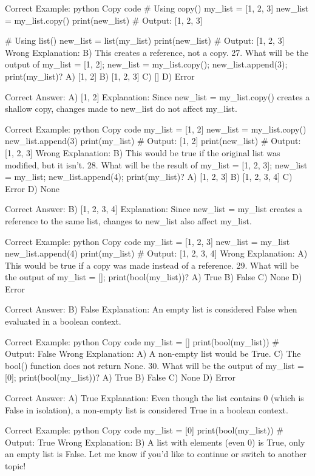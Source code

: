 Correct Example:
python
Copy code
# Using copy()
my_list = [1, 2, 3]
new_list = my_list.copy()
print(new_list)  # Output: [1, 2, 3]

# Using list()
new_list = list(my_list)
print(new_list)  # Output: [1, 2, 3]
Wrong Explanation:
B) This creates a reference, not a copy.
27. What will be the output of my_list = [1, 2]; new_list = my_list.copy(); new_list.append(3); print(my_list)?
A) [1, 2]
B) [1, 2, 3]
C) []
D) Error

Correct Answer: A) [1, 2]
Explanation: Since new_list = my_list.copy() creates a shallow copy, changes made to new_list do not affect my_list.

Correct Example:
python
Copy code
my_list = [1, 2]
new_list = my_list.copy()
new_list.append(3)
print(my_list)  # Output: [1, 2]
print(new_list)  # Output: [1, 2, 3]
Wrong Explanation:
B) This would be true if the original list was modified, but it isn't.
28. What will be the result of my_list = [1, 2, 3]; new_list = my_list; new_list.append(4); print(my_list)?
A) [1, 2, 3]
B) [1, 2, 3, 4]
C) Error
D) None

Correct Answer: B) [1, 2, 3, 4]
Explanation: Since new_list = my_list creates a reference to the same list, changes to new_list also affect my_list.

Correct Example:
python
Copy code
my_list = [1, 2, 3]
new_list = my_list
new_list.append(4)
print(my_list)  # Output: [1, 2, 3, 4]
Wrong Explanation:
A) This would be true if a copy was made instead of a reference.
29. What will be the output of my_list = []; print(bool(my_list))?
A) True
B) False
C) None
D) Error

Correct Answer: B) False
Explanation: An empty list is considered False when evaluated in a boolean context.

Correct Example:
python
Copy code
my_list = []
print(bool(my_list))  # Output: False
Wrong Explanation:
A) A non-empty list would be True.
C) The bool() function does not return None.
30. What will be the output of my_list = [0]; print(bool(my_list))?
A) True
B) False
C) None
D) Error

Correct Answer: A) True
Explanation: Even though the list contains 0 (which is False in isolation), a non-empty list is considered True in a boolean context.

Correct Example:
python
Copy code
my_list = [0]
print(bool(my_list))  # Output: True
Wrong Explanation:
B) A list with elements (even 0) is True, only an empty list is False.
Let me know if you'd like to continue or switch to another topic!






